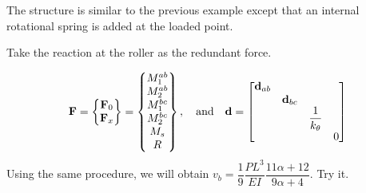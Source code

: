 \begin{example}
The structure is similar to the previous example except that an internal rotational spring is added at the loaded point.
\begin{fig}
  
\end{fig}
Take the reaction at the roller as the redundant force.
\begin{fig}
  
\end{fig}
\begin{equation*}
  \mathbf{F} = \begin{Bmatrix}\mathbf{F}_0\\ \mathbf{F}_x\end{Bmatrix} = \begin{Bmatrix}M_1^{ab}\\ M_2^{ab}\\ M_1^{bc}\\ M_2^{bc}\\ M_s\\ R\end{Bmatrix},\quad\text{and}\quad
  \mathbf{d} = \begin{bmatrix}\mathbf{d}_{ab} & & & \\ & \mathbf{d}_{bc} & & \\ & & \dfrac{1}{k_\theta} & \\ & & & 0\end{bmatrix}
\end{equation*}
Using the same procedure, we will obtain $v_b = \dfrac19\dfrac{PL^3}{EI}\dfrac{11\alpha+12}{9\alpha+4}$. Try it.
\end{example}


